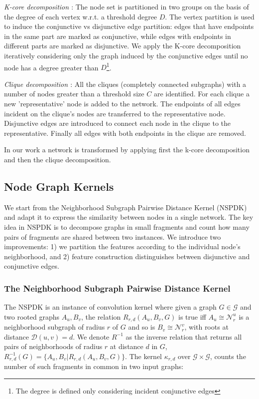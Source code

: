 \documentclass{esannV2}
\begin{document}
\textit{K-core decomposition \cite{kcore}}: The node set is partitioned in two
groups on the basis of the degree of each vertex w.r.t. a threshold degree
$D$. The vertex partition is used to induce the conjunctive vs disjunctive
edge partition: edges that have endpoints in the same part are marked as
conjunctive, while edges with endpoints in different parts are marked as
disjunctive. We apply the K-core decomposition iteratively considering only
the graph induced by the conjunctive edges until no node has a degree greater
than $D$\footnote{The degree is defined only considering incident conjunctive
edges}.

\textit{Clique decomposition \cite{clique}}:   All the cliques (completely
connected subgraphs) with a number of nodes greater than a threshold size $C$
are identified. For each clique a new 'representative' node is added to the
network. The endpoints of all edges incident on the clique's nodes are
transferred to the representative node. Disjunctive edges are introduced to
connect each node in the clique to the representative. Finally all edges with
both endpoints in the clique are removed.

In our work a network is transformed by applying first the k-core decomposition
and then the clique decomposition.

\subsection{Node Graph Kernels} 

We start from the Neighborhood Subgraph Pairwise Distance Kernel (NSPDK)
\cite{nspdk} and adapt it to express the similarity between nodes in a single
network. The key idea in NSPDK is to decompose graphs in small fragments and
count how many pairs of fragments are shared between two instances. We
introduce two improvements: 1) we partition the features according to the
individual node's neighborhood, and 2) feature construction distinguishes
between disjunctive and conjunctive edges.


\subsubsection{The Neighborhood Subgraph Pairwise Distance Kernel}

The NSPDK is an instance of convolution kernel \cite{covolution_kernel} where
given a graph $G \in \mathcal{G}$ and two rooted graphs $A_u, B_v$, the
relation $R_{r,d}(A_u, B_v, G)$ is true iff $A_u \cong \mathcal{N}_r^u$ is a neighborhood subgraph of radius $r$ of $G$ and so is $B_v \cong  \mathcal{N}_r^v$, with roots at distance
$\mathcal{D}(u,v)= d$. We denote $R^{-1}$ as the inverse relation that returns
all pairs of neighborhoods of radius $r$ at distance $d$ in $G$,
$R^{-1}_{r,d}(G) = \lbrace A_u, B_v | R_{r,d}(A_u,B_v,G)\rbrace$. The kernel
$\kappa_{r,d}$ over $\mathcal{G} \times \mathcal{G}$, counts the number of
such fragments in common in two input graphs: 
\end{document}
